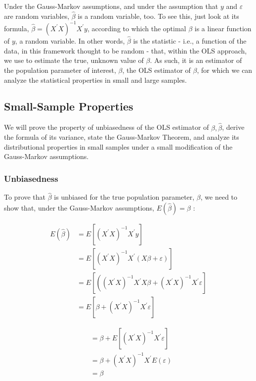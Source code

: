 Under the Gauss-Markov assumptions, and under the assumption that $y$ and $\varepsilon$ are random variables, $\widehat{\beta}$ is a random variable, too. To see this, just look at its formula, $\widehat{\beta}=\left(X^{\prime} X\right)^{-1} X^{\prime} y$, according to which the optimal $\beta$ is a linear function of $y$, a random variable. In other words, $\widehat{\beta}$ is the statistic - i.e., a function of the data, in this framework thought to be random - that, within the OLS approach, we use to estimate the true, unknown value of $\beta$. As such, it is an estimator of the population parameter of interest, $\beta$, the OLS estimator of $\beta$, for which we can analyze the statistical properties in small and large samples.

\subsection{Small-Sample Properties}
We will prove the property of unbiasedness of the OLS estimator of $\beta, \widehat{\beta}$, derive the formula of its variance, state the Gauss-Markov Theorem, and analyze its distributional properties in small samples under a small modification of the Gauss-Markov assumptions.

\subsubsection{Unbiasedness}
To prove that $\widehat{\beta}$ is unbiased for the true population parameter, $\beta$, we need to show that, under the Gauss-Markov assumptions, $E(\widehat{\beta})=\beta$ :

$$
\begin{aligned}
E(\widehat{\beta}) & =E\left[\left(X^{\prime} X\right)^{-1} X^{\prime} y\right] \\
& =E\left[\left(X^{\prime} X\right)^{-1} X^{\prime}(X \beta+\varepsilon)\right] \\
& =E\left[\left(\left(X^{\prime} X\right)^{-1} X^{\prime} X \beta+\left(X^{\prime} X\right)^{-1} X^{\prime} \varepsilon\right]\right. \\
& =E\left[\beta+\left(X^{\prime} X\right)^{-1} X^{\prime} \varepsilon\right]
\end{aligned}
$$

$$
\begin{aligned}
& =\beta+E\left[\left(X^{\prime} X\right)^{-1} X^{\prime} \varepsilon\right] \\
& =\beta+\left(X^{\prime} X\right)^{-1} X^{\prime} E(\varepsilon) \\
& =\beta
\end{aligned}
$$

